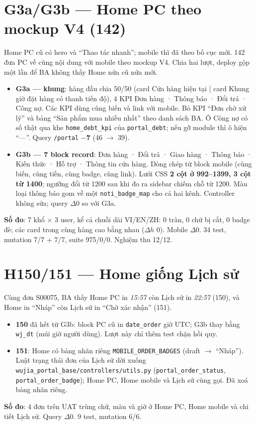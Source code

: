 \section{G3a/G3b --- Home PC theo mockup V4 (142)}

Home PC cũ có hero và ``Thao tác nhanh''; mobile thì đã theo bố cục mới. 142 đưa PC về cùng nội dung với mobile theo
mockup V4. Chia hai lượt, deploy gộp một lần để BA không thấy Home nửa cũ nửa mới.
\begin{itemize}[nosep]
\item \textbf{G3a --- khung}: hàng đầu chia 50/50 (card Cửa hàng hiện tại | card Khung giờ đặt hàng có thanh tiến độ),
  4 KPI Đơn hàng · Thông báo · Đổi trả · Công nợ. Các KPI dùng cùng biến và link với mobile. Bỏ KPI ``Đơn chờ xử lý'' và
  bảng ``Sản phẩm mua nhiều nhất'' theo danh sách BA. Ô Công nợ có số thật qua khe \texttt{home\_debt\_kpi} của
  \texttt{portal\_debt}; nếu gỡ module thì ô hiện ``---''. Query \texttt{/portal} \textbf{$-$7} (46 $\to$ 39).
\item \textbf{G3b --- 7 block record}: Đơn hàng · Đổi trả · Giao hàng · Thông báo · Kiến thức · Hỗ trợ · Thông tin cửa
  hàng. Dòng chép từ block mobile (cùng biến, cùng tiền, cùng badge, cùng link). Lưới CSS \textbf{2 cột ở 992--1399, 3 cột
  từ 1400}; ngưỡng đổi từ 1200 sau khi đo ra sidebar chiếm chỗ từ 1200. Màu loại thông báo gom về một
  \texttt{noti\_badge\_map} cho cả hai kênh. Controller không sửa; query $\Delta$0 so với G3a.
\end{itemize}
\textbf{Số đo}: 7 khổ $\times$ 3 user, kể cả chuỗi dài VI/EN/ZH: 0 tràn, 0 chữ bị cắt, 0 badge đè; các card trong cùng hàng
cao bằng nhau ($\Delta h$ 0). Mobile $\Delta$0. 34 test, mutation 7/7 + 7/7, suite 975/0/0. Nghiệm thu 12/12.

\section{H150/151 --- Home giống Lịch sử}

Cùng đơn S00075, BA thấy Home PC in \emph{15:57} còn Lịch sử in \emph{22:57} (150), và Home in ``Nháp'' còn Lịch sử in
``Chờ xác nhận'' (151).
\begin{itemize}[nosep]
\item \textbf{150} đã hết từ G3b: block PC cũ in \texttt{date\_order} giờ UTC; G3b thay bằng \texttt{wj\_dt} (múi giờ người
  dùng). Lượt này chỉ thêm test chặn hồi quy.
\item \textbf{151}: Home có bảng nhãn riêng \texttt{MOBILE\_ORDER\_BADGES} (draft $\to$ ``Nháp''). Luật trạng thái đơn của Lịch
  sử dời xuống \texttt{wujia\_portal\_base/controllers/utils.py} (\texttt{portal\_order\_status}, \texttt{portal\_order\_badge});
  Home PC, Home mobile và Lịch sử cùng gọi. Đã xoá bảng nhãn riêng.
\end{itemize}
\textbf{Số đo}: 4 đơn trên UAT trùng chữ, màu và giờ ở Home PC, Home mobile và chi tiết Lịch sử. Query $\Delta$0.
9 test, mutation 6/6.

